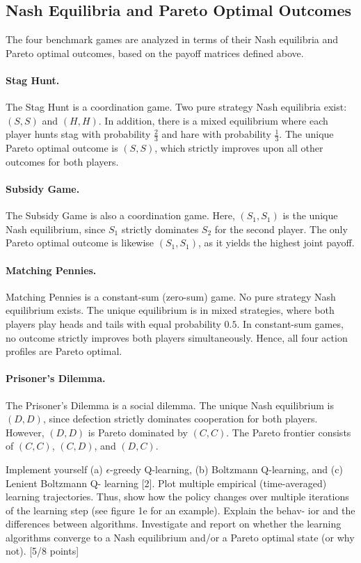 \subsection{Nash Equilibria and Pareto Optimal Outcomes}

The four benchmark games are analyzed in terms of their Nash equilibria and Pareto optimal outcomes, based on the payoff matrices defined above.

\paragraph{Stag Hunt.}  
The Stag Hunt is a coordination game. Two pure strategy Nash equilibria exist: $(S,S)$ and $(H,H)$. In addition, there is a mixed equilibrium where each player hunts stag with probability $\tfrac{2}{3}$ and hare with probability $\tfrac{1}{3}$. The unique Pareto optimal outcome is $(S,S)$, which strictly improves upon all other outcomes for both players.

\paragraph{Subsidy Game.}  
The Subsidy Game is also a coordination game. Here, $(S_{1},S_{1})$ is the unique Nash equilibrium, since $S_{1}$ strictly dominates $S_{2}$ for the second player. The only Pareto optimal outcome is likewise $(S_{1},S_{1})$, as it yields the highest joint payoff.

\paragraph{Matching Pennies.}  
Matching Pennies is a constant-sum (zero-sum) game. No pure strategy Nash equilibrium exists. The unique equilibrium is in mixed strategies, where both players play heads and tails with equal probability $0.5$. In constant-sum games, no outcome strictly improves both players simultaneously. Hence, all four action profiles are Pareto optimal.

\paragraph{Prisoner’s Dilemma.}  
The Prisoner’s Dilemma is a social dilemma. The unique Nash equilibrium is $(D,D)$, since defection strictly dominates cooperation for both players. However, $(D,D)$ is Pareto dominated by $(C,C)$. The Pareto frontier consists of $(C,C)$, $(C,D)$, and $(D,C)$.


Implement yourself (a) $\epsilon$-greedy Q-learning, (b) Boltzmann Q-learning, and (c) Lenient Boltzmann Q-
learning [2]. Plot multiple empirical (time-averaged) learning trajectories. Thus, show how the policy
changes over multiple iterations of the learning step (see figure 1e for an example). Explain the behav-
ior and the differences between algorithms. Investigate and report on whether the learning algorithms
converge to a Nash equilibrium and/or a Pareto optimal state (or why not). [5/8 points]

